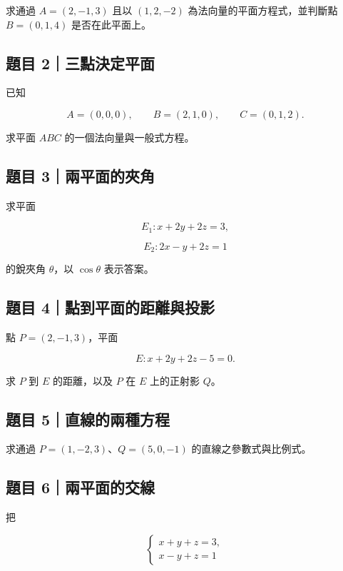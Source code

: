 \documentclass[11pt,a4paper]{article}
\begin{document}
求通過 \(A=(2,-1,3)\) 且以 \((1,2,-2)\) 為法向量的平面方程式，並判斷點 \(B=(0,1,4)\) 是否在此平面上。

\subsection{題目 2｜三點決定平面}\label{ux984cux76ee-2ux4e09ux9edeux6c7aux5b9aux5e73ux9762}

已知

\[
A=(0,0,0),\qquad B=(2,1,0),\qquad C=(0,1,2).
\]

求平面 \(ABC\) 的一個法向量與一般式方程。

\subsection{題目 3｜兩平面的夾角}\label{ux984cux76ee-3ux5169ux5e73ux9762ux7684ux593eux89d2}

求平面

\[
E_1:x+2y+2z=3,
\]

\[
E_2:2x-y+2z=1
\]

的銳夾角 \(\theta\)，以 \(\cos\theta\) 表示答案。

\subsection{題目 4｜點到平面的距離與投影}\label{ux984cux76ee-4ux9edeux5230ux5e73ux9762ux7684ux8dddux96e2ux8207ux6295ux5f71}

點 \(P=(2,-1,3)\)，平面

\[
E:x+2y+2z-5=0.
\]

求 \(P\) 到 \(E\) 的距離，以及 \(P\) 在 \(E\) 上的正射影 \(Q\)。

\subsection{題目 5｜直線的兩種方程}\label{ux984cux76ee-5ux76f4ux7ddaux7684ux5169ux7a2eux65b9ux7a0b}

求通過 \(P=(1,-2,3)\)、\(Q=(5,0,-1)\) 的直線之參數式與比例式。

\subsection{題目 6｜兩平面的交線}\label{ux984cux76ee-6ux5169ux5e73ux9762ux7684ux4ea4ux7dda}

把

\[
\begin{cases}
x+y+z=3,\\
x-y+z=1
\end{cases}
\]
\end{document}
